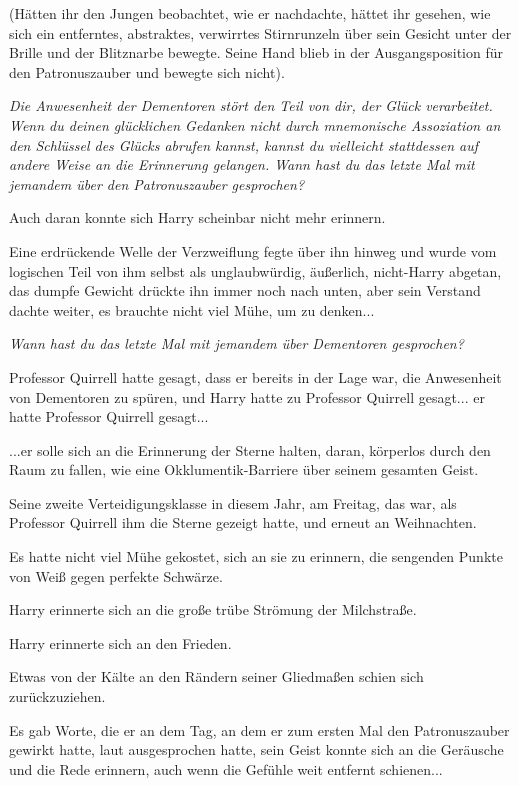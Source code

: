 {(Hätten ihr den Jungen beobachtet, wie er nachdachte, hättet ihr gesehen, wie sich ein entferntes, abstraktes, verwirrtes Stirnrunzeln über sein Gesicht unter der Brille und der Blitznarbe bewegte. Seine Hand blieb in der Ausgangsposition für den Patronuszauber und bewegte sich nicht).

\emph{Die Anwesenheit der Dementoren stört den Teil von dir, der Glück verarbeitet. Wenn du deinen glücklichen Gedanken nicht durch mnemonische Assoziation an den Schlüssel des Glücks abrufen kannst, kannst du vielleicht stattdessen auf andere Weise an die Erinnerung gelangen. Wann hast du das letzte Mal mit jemandem über den Patronuszauber gesprochen?}

Auch daran konnte sich Harry scheinbar nicht mehr erinnern.

Eine erdrückende Welle der Verzweiflung fegte über ihn hinweg und wurde vom logischen Teil von ihm selbst als unglaubwürdig, äußerlich, nicht-Harry abgetan, das dumpfe Gewicht drückte ihn immer noch nach unten, aber sein Verstand dachte weiter, es brauchte nicht viel Mühe, um zu denken...

\emph{Wann hast du das letzte Mal mit jemandem über Dementoren gesprochen?}

Professor Quirrell hatte gesagt, dass er bereits in der Lage war, die Anwesenheit von Dementoren zu spüren, und Harry hatte zu Professor Quirrell gesagt... er hatte Professor Quirrell gesagt...

...er solle sich an die Erinnerung der Sterne halten, daran, körperlos durch den Raum zu fallen, wie eine Okklumentik-Barriere über seinem gesamten Geist.

Seine zweite Verteidigungsklasse in diesem Jahr, am Freitag, das war, als Professor Quirrell ihm die Sterne gezeigt hatte, und erneut an Weihnachten.

Es hatte nicht viel Mühe gekostet, sich an sie zu erinnern, die sengenden Punkte von Weiß gegen perfekte Schwärze.

Harry erinnerte sich an die große trübe Strömung der Milchstraße.

Harry erinnerte sich an den Frieden.

Etwas von der Kälte an den Rändern seiner Gliedmaßen schien sich zurückzuziehen.

Es gab Worte, die er an dem Tag, an dem er zum ersten Mal den Patronuszauber gewirkt hatte, laut ausgesprochen hatte, sein Geist konnte sich an die Geräusche und die Rede erinnern, auch wenn die Gefühle weit entfernt schienen...

}
